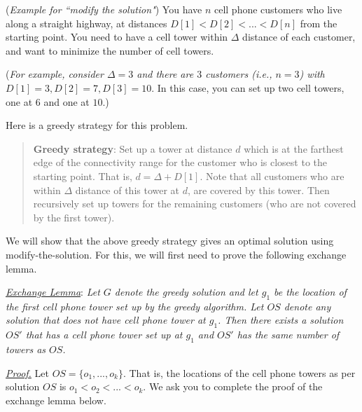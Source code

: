 \documentclass[answers]{exam}
\begin{document}
\begin{questions}
\vspace{0.3in}








\question ({\it Example for ``modify the solution"})
You have $n$ cell phone customers who live along a straight highway, at distances $D[1] < D[2] <  ... < D[n]$ from the starting point.  
You need to have a cell tower within $\Delta$ distance of
each customer, and want to minimize the number of cell towers.  

({\it For example, consider $\Delta=3$ and there are $3$ customers  (i.e., $n = 3$) with $D[1] = 3, D[2] = 7, D[3] = 10$}. In this case, you can set up two cell towers, one at $6$ and one at $10$.)

Here is a greedy strategy for this problem.
\begin{quote}
{\bf Greedy strategy}: Set up a tower at distance $d$ which is at the farthest edge of the connectivity range for the customer who is closest to the starting point. That is, $d = \Delta + D[1]$. Note that all customers who are within $\Delta$ distance of this tower at $d$, are covered by this tower. 
Then recursively set up towers for the remaining customers (who are not covered by the first tower).
\end{quote}

We will show that the above greedy strategy gives an optimal solution using modify-the-solution. For this, we will first need to prove the following exchange lemma.

\underline{\it Exchange Lemma}: {\it Let $G$ denote the greedy solution and let $g_1$ be the location of the first cell phone tower set up by the greedy algorithm. Let $OS$ denote any solution that does not have cell phone tower at $g_1$. Then there exists a solution $OS'$ that has a cell phone tower set up at $g_1$ and $OS'$ has the same number of towers as $OS$.}

\underline{\it Proof.} Let $OS = \{o_1, ..., o_k\}$. That is, the locations of the cell phone towers as per solution $OS$ is $o_1 < o_2 < ... < o_k$. We ask you to complete the proof of the exchange lemma below.

\end{questions}
\end{document}
